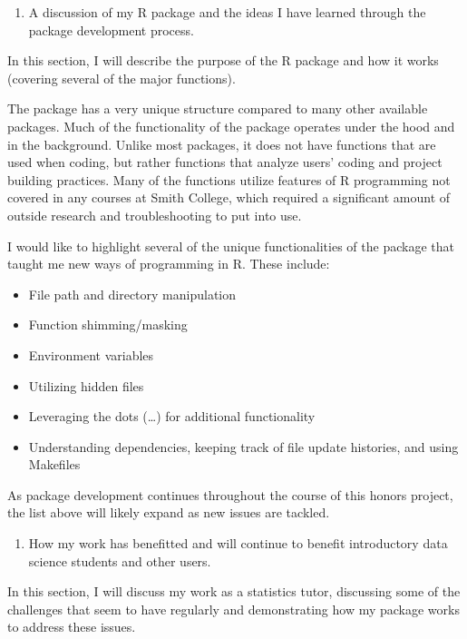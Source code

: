 \documentclass[12pt]{article}
\providecommand{\tightlist}{%
  \setlength{\itemsep}{0pt}\setlength{\parskip}{0pt}}
\begin{document}
\begin{enumerate}
\def\labelenumi{\arabic{enumi})}
\setcounter{enumi}{1}
\tightlist
\item
  A discussion of my R package and the ideas I have learned through the
  package development process.
\end{enumerate}

In this section, I will describe the purpose of the R package and how it
works (covering several of the major functions).

The package has a very unique structure compared to many other available
packages. Much of the functionality of the package operates under the
hood and in the background. Unlike most packages, it does not have
functions that are used when coding, but rather functions that analyze
users' coding and project building practices. Many of the functions
utilize features of R programming not covered in any courses at Smith
College, which required a significant amount of outside research and
troubleshooting to put into use.

I would like to highlight several of the unique functionalities of the
package that taught me new ways of programming in R. These include:

\begin{itemize}
\item
  File path and directory manipulation
\item
  Function shimming/masking
\item
  Environment variables
\item
  Utilizing hidden files
\item
  Leveraging the dots (\ldots{}) for additional functionality
\item
  Understanding dependencies, keeping track of file update histories,
  and using Makefiles
\end{itemize}

As package development continues throughout the course of this honors
project, the list above will likely expand as new issues are tackled.

\begin{enumerate}
\def\labelenumi{\arabic{enumi})}
\setcounter{enumi}{2}
\tightlist
\item
  How my work has benefitted and will continue to benefit introductory
  data science students and other users.
\end{enumerate}

In this section, I will discuss my work as a statistics tutor,
discussing some of the challenges that seem to have regularly and
demonstrating how my package works to address these issues.
\end{document}
